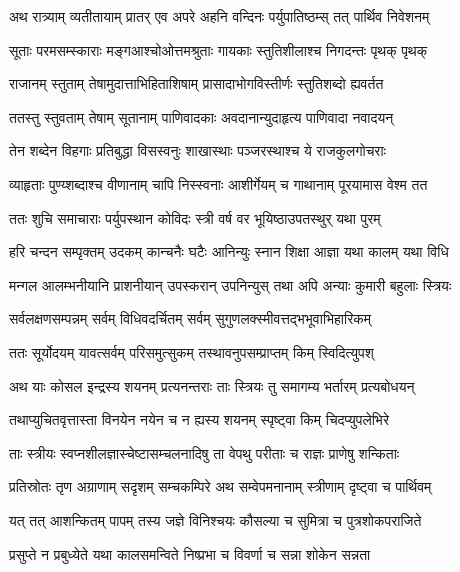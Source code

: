 
\twolineshloka
{अथ रात्र्याम् व्यतीतायाम् प्रातर् एव अपरे अहनि}
{वन्दिनः पर्युपातिष्ठम्स् तत् पार्थिव निवेशनम्} %

\twolineshloka
{सूताः परमसम्स्काराः मङ्गआश्चोओत्तमश्रुताः}
{गायकाः स्तुतिशीलाश्च निगदन्तः पृथक् पृथक्} %

\twolineshloka
{राजानम् स्तुताम् तेषामुदात्ताभिहिताशिषाम्}
{प्रासादाभोगविस्तीर्णः स्तुतिशब्दो ह्यवर्तत} %

\twolineshloka
{ततस्तु स्तुवताम् तेषाम् सूतानाम् पाणिवादकाः}
{अवदानान्युदाहृत्य पाणिवादा नवादयन्} %

\twolineshloka
{तेन शब्देन विहगाः प्रतिबुद्धा विसस्वनुः}
{शाखास्थाः पञ्जरस्थाश्च ये राजकुलगोचराः} %

\twolineshloka
{व्याहृताः पुण्य्शब्दाश्च वीणानाम् चापि निस्स्वनाः}
{आशीर्गेयम् च गाथानाम् पूरयामास वेश्म तत} %

\twolineshloka
{ततः शुचि समाचाराः पर्युपस्थान कोविदः}
{स्त्री वर्ष वर भूयिष्ठाउपतस्थुर् यथा पुरम्} %

\twolineshloka
{हरि चन्दन सम्पृक्तम् उदकम् कान्चनैः घटैः}
{आनिन्युः स्नान शिक्षा आज्ञा यथा कालम् यथा विधि} %

\twolineshloka
{मन्गल आलम्भनीयानि प्राशनीयान् उपस्करान्}
{उपनिन्युस् तथा अपि अन्याः कुमारी बहुलाः स्त्रियः} %

\twolineshloka
{सर्वलक्षणसम्पन्नम् सर्वम् विधिवदर्चितम्}
{सर्वम् सुगुणलक्स्मीवत्तद्भभूवाभिहारिकम्} %

\twolineshloka
{ततः सूर्योदयम् यावत्सर्वम् परिसमुत्सुकम्}
{तस्थावनुपसम्प्राप्तम् किम् स्विदित्युपश्} %

\twolineshloka
{अथ याः कोसल इन्द्रस्य शयनम् प्रत्यनन्तराः}
{ताः स्त्रियः तु समागम्य भर्तारम् प्रत्यबोधयन्} %

\twolineshloka
{तथाप्युचितवृत्तास्ता विनयेन नयेन च}
{न ह्यस्य शयनम् स्पृष्ट्वा किम् चिदप्युपलेभिरे} %

\twolineshloka
{ताः स्त्रीयः स्वप्नशीलज्ञास्चेष्टासम्चलनादिषु}
{ता वेपथु परीताः च राज्ञः प्राणेषु शन्किताः} %

\twolineshloka
{प्रतिस्रोतः तृण अग्राणाम् सदृशम् सम्चकम्पिरे}
{अथ सम्वेपमनानाम् स्त्रीणाम् दृष्ट्वा च पार्थिवम्} %

\twolineshloka
{यत् तत् आशन्कितम् पापम् तस्य जज्ञे विनिश्चयः}
{कौसल्या च सुमित्रा च पुत्रशोकपराजिते} %

\twolineshloka
{प्रसुप्ते न प्रबुध्येते यथा कालसमन्विते}
{निष्प्रभा च विवर्णा च सन्ना शोकेन सन्नता} %

